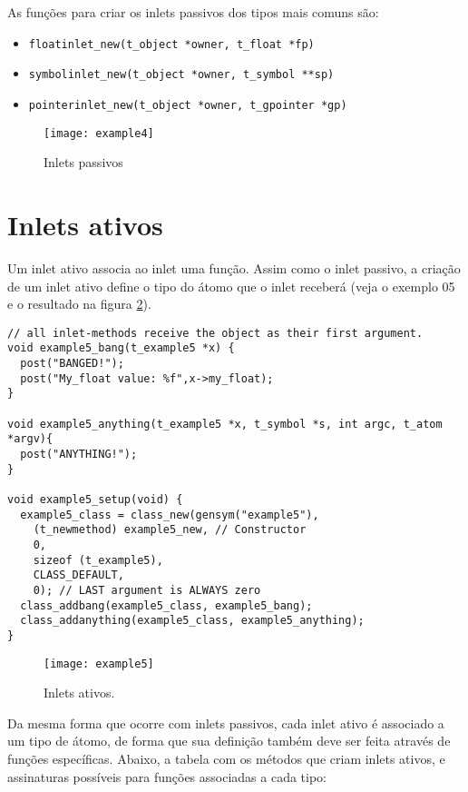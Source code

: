 As funções para criar os inlets passivos dos tipos mais comuns são:

\begin{itemize}
\item \texttt{floatinlet\_new(t\_object *owner, t\_float *fp)}
\item \texttt{symbolinlet\_new(t\_object *owner, t\_symbol **sp)}
\item \texttt{pointerinlet\_new(t\_object *owner, t\_gpointer *gp)}
\end{itemize}

\begin{figure}[h!]
\centering
\texttt{[image: example4]}
\caption{Inlets passivos}
\label{fig:inlet-passivo}
\end{figure}

\section{Inlets ativos}

Um inlet ativo associa ao inlet uma função. Assim como o inlet passivo, a
criação de um inlet ativo define o tipo do átomo que o inlet receberá (veja o
exemplo 05 e o resultado na figura \ref{fig:inlet-ativo}).

\begin{lstlisting}
// all inlet-methods receive the object as their first argument.
void example5_bang(t_example5 *x) { 
  post("BANGED!");
  post("My_float value: %f",x->my_float);
}

void example5_anything(t_example5 *x, t_symbol *s, int argc, t_atom *argv){
  post("ANYTHING!");
}

void example5_setup(void) {
  example5_class = class_new(gensym("example5"),
    (t_newmethod) example5_new, // Constructor
    0, 
    sizeof (t_example5),
    CLASS_DEFAULT,
    0); // LAST argument is ALWAYS zero
  class_addbang(example5_class, example5_bang);
  class_addanything(example5_class, example5_anything);
}
\end{lstlisting}

\begin{figure}[h!]
\centering
\texttt{[image: example5]}
\caption{Inlets ativos.}
\label{fig:inlet-ativo}
\end{figure}

Da mesma forma que ocorre com inlets passivos, cada inlet ativo é associado a
um tipo de átomo, de forma que sua definição também deve ser feita através de
funções específicas.  Abaixo, a tabela com os métodos que criam inlets ativos,
e assinaturas possíveis para funções associadas a cada tipo:

